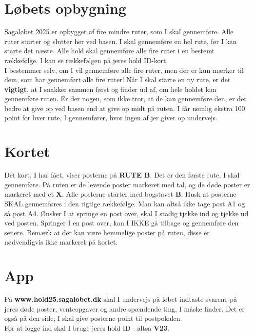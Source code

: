 \section{Løbets opbygning}
Sagaløbet 2025 er opbygget af fire mindre ruter, som I skal gennemføre. Alle ruter starter og slutter her ved basen. I skal gennemføre en hel rute, før I kan starte det næste. Alle hold skal gennemføre alle fire ruter i en bestemt rækkefølge. I kan se rækkefølgen på jeres hold ID-kort.\\\newline
I bestemmer selv, om I vil gennemføre alle fire ruter, men der er kun mærker til dem, som har gennemført alle fire ruter! Når I skal starte en ny rute, er det \textbf{vigtigt}, at I snakker sammen først og finder ud af, om hele holdet kan gennemføre ruten. Er der nogen, som ikke tror, at de kan gennemføre den, er det bedre at give op ved basen end at give op midt på ruten. I får nemlig ekstra 100 point for hver rute, I gennemfører, hvor ingen af jer giver op undervejs.\\
\section{Kortet}
Det kort, I har fået, viser posterne på \textbf{RUTE B}. Det er den første rute, I skal gennemføre. På ruten er de levende poster markeret med tal, og de døde poster er markeret med et \textbf{X}. Alle posterne starter med bogstavet \textbf{B}. Husk at posterne SKAL gennemføres i den rigtige rækkefølge. Man kan altså ikke tage post A1 og så post A4. Ønsker I at springe en post over, skal I stadig tjekke ind og tjekke ud ved posten. Springer I en post over, kan I IKKE gå tilbage og gennemføre den senere. Bemærk at der kan være hemmelige poster på ruten, disse er nødvendigvis ikke markeret på kortet.
\section{App}
På \textbf{www.hold25.sagalobet.dk} skal I undervejs på løbet indtaste svarene på jeres døde poster, venteopgaver og andre spændende ting, I måske finder. Det er også på den side, I skal give posterne point til postpokalen.\\
For at logge ind skal I bruge jeres hold ID - altså \textbf{V23}.
\newpage
